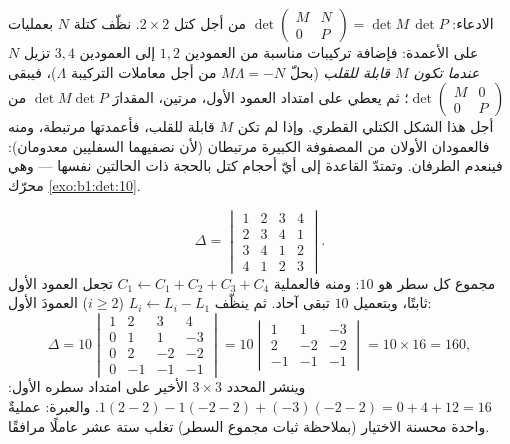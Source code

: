 \begin{example}
\label{ex:b1:det:blocktriangular}
الادعاء: $\det\begin{pmatrix} M & N\\ 0 & P\end{pmatrix} = \det
M\,\det P$ من أجل كتل $2\times2$. نظّف كتلة $N$ بعمليات
على الأعمدة: فإضافة تركيبات مناسبة من العمودين $1, 2$ إلى العمودين
$3, 4$ تزيل $N$ \emph{عندما تكون $M$ قابلة للقلب} (بحلّ
$M\Lambda = -N$ من أجل معاملات التركيبة $\Lambda$)،
فيبقى $\det\begin{pmatrix} M & 0\\ 0 & P\end{pmatrix}$؛ ثم يعطي
 على امتداد العمود الأول، مرتين، المقدارَ $\det
M\det P$ من أجل هذا الشكل الكتلي القطري. وإذا لم تكن $M$
قابلة للقلب، فأعمدتها مرتبطة، ومنه فالعمودان الأولان من
المصفوفة الكبيرة مرتبطان (لأن نصفيهما السفليين معدومان): فينعدم
الطرفان. وتمتدّ القاعدة إلى أيّ أحجام كتل بالحجة ذات
الحالتين نفسها --- وهي محرّك
\cref{exo:b1:det:10}.
\end{example}

\begin{example}
\label{ex:b1:det:fourbyfour}
\[
\Delta = \begin{vmatrix}
1 & 2 & 3 & 4\\
2 & 3 & 4 & 1\\
3 & 4 & 1 & 2\\
4 & 1 & 2 & 3
\end{vmatrix}.
\]
مجموع كل سطر هو $10$: ومنه فالعملية $C_1 \leftarrow C_1 + C_2 +
C_3 + C_4$ تجعل العمود الأول ثابتًا، وبتعميل $10$
تبقى آحاد. ثم ينظّف $L_i \leftarrow L_i - L_1$ ($i \geq 2$)
العمودَ الأول:
\[
\Delta = 10\begin{vmatrix}
1 & 2 & 3 & 4\\
0 & 1 & 1 & -3\\
0 & 2 & -2 & -2\\
0 & -1 & -1 & -1
\end{vmatrix}
= 10\begin{vmatrix}
1 & 1 & -3\\
2 & -2 & -2\\
-1 & -1 & -1
\end{vmatrix}
= 10 \times 16 = 160,
\]
وينشر المحدد $3\times3$ الأخير على امتداد سطره الأول:
$1(2 - 2) - 1(-2 - 2) + (-3)(-2 - 2) = 0 + 4 + 12 = 16$. والعبرة:
عمليةٌ واحدة محسنة الاختيار (بملاحظة ثبات مجموع السطر) تغلب
ستة عشر عاملًا مرافقًا.
\end{example}

